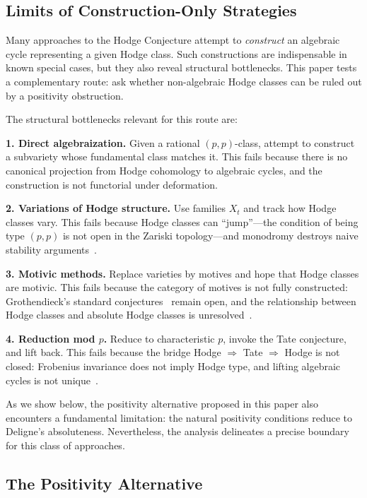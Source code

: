 \documentclass[aps,prd,twocolumn,superscriptaddress,nofootinbib]{revtex4-2}
\theoremstyle{definition}
\theoremstyle{remark}
\begin{document}
\subsection{Limits of Construction-Only Strategies}

Many approaches to the Hodge Conjecture attempt to \textit{construct} an algebraic cycle representing a given Hodge class. Such constructions are indispensable in known special cases, but they also reveal structural bottlenecks. This paper tests a complementary route: ask whether non-algebraic Hodge classes can be ruled out by a positivity obstruction.

The structural bottlenecks relevant for this route are:

\textbf{1. Direct algebraization.} Given a rational $(p,p)$-class, attempt to construct a subvariety whose fundamental class matches it. This fails because there is no canonical projection from Hodge cohomology to algebraic cycles, and the construction is not functorial under deformation.

\textbf{2. Variations of Hodge structure.} Use families $X_t$ and track how Hodge classes vary. This fails because Hodge classes can ``jump''---the condition of being type $(p,p)$ is not open in the Zariski topology---and monodromy destroys naive stability arguments~\cite{Voisin2002}.

\textbf{3. Motivic methods.} Replace varieties by motives and hope that Hodge classes are motivic. This fails because the category of motives is not fully constructed: Grothendieck's standard conjectures~\cite{Grothendieck1969} remain open, and the relationship between Hodge classes and absolute Hodge classes is unresolved~\cite{Andre1996}.

\textbf{4. Reduction mod $p$.} Reduce to characteristic $p$, invoke the Tate conjecture, and lift back. This fails because the bridge Hodge $\Rightarrow$ Tate $\Rightarrow$ Hodge is not closed: Frobenius invariance does not imply Hodge type, and lifting algebraic cycles is not unique~\cite{Charles2013}.

As we show below, the positivity alternative proposed in this paper also encounters a fundamental limitation: the natural positivity conditions reduce to Deligne's absoluteness. Nevertheless, the analysis delineates a precise boundary for this class of approaches.

\subsection{The Positivity Alternative}
\end{document}
